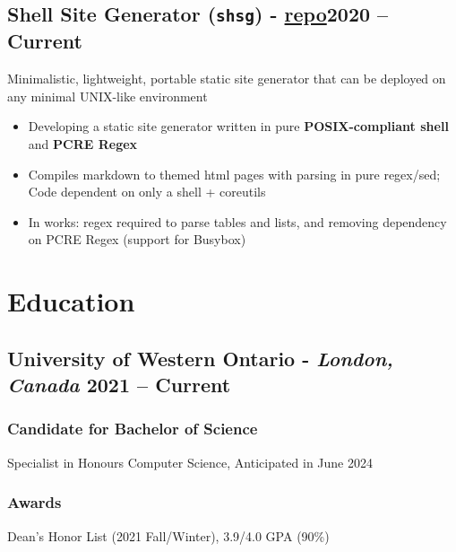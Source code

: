 \documentclass[9pt]{article}
\begin{document}
\subsection{Shell Site Generator (\texttt{shsg}) \normalsize\textnormal{- \href{https://github.com/ianayl/shsg}{repo}}\hfill \normalsize\textnormal{2020 -- Current}}
    Minimalistic, lightweight, portable static site generator that can be deployed on any minimal UNIX-like environment
\vspace{-0.5em}
\begin{itemize}
  \item Developing a static site generator written in pure \textbf{POSIX-compliant shell} and \textbf{PCRE Regex}
    \item Compiles markdown to themed html pages with parsing in pure regex/sed; Code dependent on only a shell + coreutils 
    \item In works: regex required to parse tables and lists, and removing dependency on PCRE Regex (support for Busybox)
\end{itemize}

\section{Education}
\subsection{University of Western Ontario - \normalsize\textit{London, Canada} \hfill \normalsize\textnormal{2021 -- Current}}
\subsubsection{Candidate for Bachelor of Science} Specialist in Honours Computer Science, Anticipated in June 2024

\subsubsection{Awards} Dean's Honor List (2021 Fall/Winter), 3.9/4.0 GPA (90\%)
\end{document}

